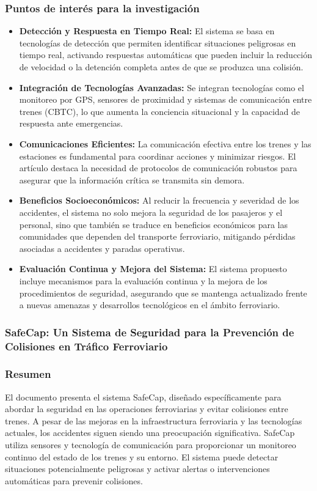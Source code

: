 \documentclass[journal]{IEEEtran}
\begin{document}
\subsubsection*{Puntos de interés para la investigación}
\begin{itemize}
    \item \textbf{Detección y Respuesta en Tiempo Real:}
    El sistema se basa en tecnologías de detección que permiten identificar situaciones peligrosas en tiempo real, activando respuestas automáticas que pueden incluir la reducción de velocidad o la detención completa antes de que se produzca una colisión\cite{railwaycouncil2017realsafetysystem}.
    \item \textbf{Integración de Tecnologías Avanzadas:}
    Se integran tecnologías como el monitoreo por GPS, sensores de proximidad y sistemas de comunicación entre trenes (CBTC), lo que aumenta la conciencia situacional y la capacidad de respuesta ante emergencias\cite{railwaycouncil2017realsafetysystem}.
    \item \textbf{Comunicaciones Eficientes:}
    La comunicación efectiva entre los trenes y las estaciones es fundamental para coordinar acciones y minimizar riesgos. El artículo destaca la necesidad de protocolos de comunicación robustos para asegurar que la información crítica se transmita sin demora\cite{railwaycouncil2017realsafetysystem}.
    \item \textbf{Beneficios Socioeconómicos:}
    Al reducir la frecuencia y severidad de los accidentes, el sistema no solo mejora la seguridad de los pasajeros y el personal, sino que también se traduce en beneficios económicos para las comunidades que dependen del transporte ferroviario, mitigando pérdidas asociadas a accidentes y paradas operativas\cite{railwaycouncil2017realsafetysystem}.
    \item \textbf{Evaluación Continua y Mejora del Sistema:}
    El sistema propuesto incluye mecanismos para la evaluación continua y la mejora de los procedimientos de seguridad, asegurando que se mantenga actualizado frente a nuevas amenazas y desarrollos tecnológicos en el ámbito ferroviario\cite{railwaycouncil2017realsafetysystem}.
\end{itemize}

\subsubsection{SafeCap: Un Sistema de Seguridad para la Prevención de Colisiones en Tráfico Ferroviario}
\subsubsection*{Resumen}
El documento presenta el sistema SafeCap, diseñado específicamente para abordar la seguridad en las operaciones ferroviarias y evitar colisiones entre trenes. A pesar de las mejoras en la infraestructura ferroviaria y las tecnologías actuales, los accidentes siguen siendo una preocupación significativa. SafeCap utiliza sensores y tecnología de comunicación para proporcionar un monitoreo continuo del estado de los trenes y su entorno. El sistema puede detectar situaciones potencialmente peligrosas y activar alertas o intervenciones automáticas para prevenir colisiones.
\end{document}
